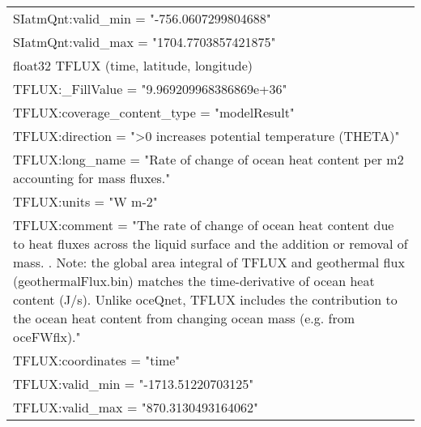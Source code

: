 \begin{longtable}{|p{\textwidth}|}
\hspace{0.5cm}\hspace{0.5cm}SIatmQnt:valid\_min = "-756.0607299804688"\\
\hspace{0.5cm}\hspace{0.5cm}SIatmQnt:valid\_max = "1704.7703857421875"\\
\hspace{0.5cm}float32 TFLUX (time, latitude, longitude)\\
\hspace{0.5cm}\hspace{0.5cm}TFLUX:\_FillValue = "9.969209968386869e+36"\\
\hspace{0.5cm}\hspace{0.5cm}TFLUX:coverage\_content\_type = "modelResult"\\
\hspace{0.5cm}\hspace{0.5cm}TFLUX:direction = ">0 increases potential temperature (THETA)"\\
\hspace{0.5cm}\hspace{0.5cm}TFLUX:long\_name = "Rate of change of ocean heat content per m2 accounting for mass fluxes."\\
\hspace{0.5cm}\hspace{0.5cm}TFLUX:units = "W m-2"\\
\hspace{0.5cm}\hspace{0.5cm}TFLUX:comment = "The rate of change of ocean heat content due to heat fluxes across the liquid surface and the addition or removal of mass. . Note: the global area integral of TFLUX and geothermal flux (geothermalFlux.bin) matches the time-derivative of ocean heat content (J/s). Unlike oceQnet, TFLUX includes the contribution to the ocean heat content from changing ocean mass (e.g. from oceFWflx)."\\
\hspace{0.5cm}\hspace{0.5cm}TFLUX:coordinates = "time"\\
\hspace{0.5cm}\hspace{0.5cm}TFLUX:valid\_min = "-1713.51220703125"\\
\hspace{0.5cm}\hspace{0.5cm}TFLUX:valid\_max = "870.3130493164062"\\

\end{longtable}
